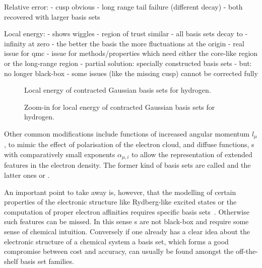 Relative error:
- cusp obvious
- long range tail failure (different decay)
- both recovered with larger basis sets

Local energy:
- shows wiggles
- region of trust similar
- all basis sets decay to -infinity at zero
- the better the basis the more fluctuations at the origin
- real issue for qmc
- issue for methods/properties which need either the core-like region
  or the long-range region
- partial solution: specially constructed basis sets
- but: no longer black-box
- some issues (like the missing cusp) cannot be corrected fully




\begin{figure}
	\centering
	\caption{Local energy of contracted Gaussian basis sets for hydrogen.}
	\label{fig:LocalEnergyCgto}
\end{figure}

\begin{figure}
	\centering
	\caption{Zoom-in for local energy of contracted Gaussian basis sets for hydrogen.}
	\label{fig:LocalEnergyCgtoZoom}
\end{figure}



Other common modifications include functions of increased angular momentum $l_\mu$,
to mimic the effect of polarisation of the electron cloud,
and diffuse functions,
\ie {\cGTO}s with comparatively small exponents $\alpha_{\mu,i}$
to allow the representation of extended features in the electron density.
The former kind of basis sets are called 
and the latter ones  or .



An important point to take away is, however,
that the modelling of certain properties of the electronic structure
like Rydberg-like excited states or the computation of proper electron affinities
requires specific basis sets~\cite{Hill2013,Jensen2013}.
Otherwise such features can be missed.
In this sense {\cGTO}s are not black-box and require some sense of chemical intuition.
Conversely if one already has a clear idea about the electronic structure
of a chemical system a basis set,
which forms a good compromise between cost and accuracy,
can usually be found amongst the off-the-shelf basis set families.


%
%



